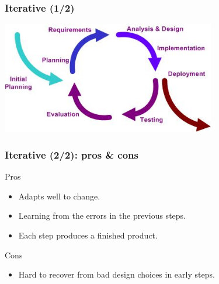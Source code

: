 \documentclass[10pt]{beamer}
\begin{document}
\begin{frame}[fragile]
  \frametitle{Iterative (1/2)}
  \begin{center}
    \includegraphics[width=0.7\textwidth]{iterative_model}
  \end{center}
\end{frame}
\begin{frame}[fragile]
  \frametitle{Iterative (2/2): pros \& cons}
  \begin{exampleblock}{Pros}
    \begin{itemize}
    \item Adapts well to change.
    \item Learning from the errors in the previous steps.
    \item Each step produces a finished product.
    \end{itemize}
  \end{exampleblock}
  \begin{alertblock}{Cons}
    \begin{itemize}
    \item Hard to recover from bad design choices in early steps.
    \end{itemize}
  \end{alertblock}
\end{frame}
\end{document}
